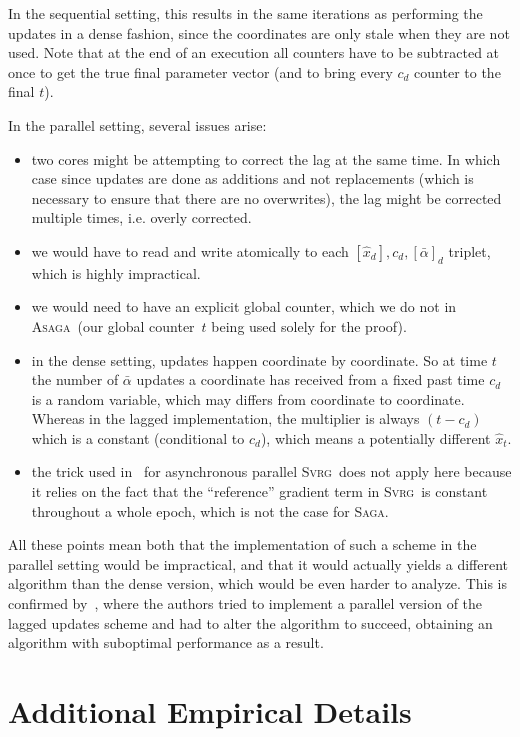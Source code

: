 \documentclass[twoside, 11pt]{article}
\newcommand{\ASAGA}{\textsc{Asaga}}
\newcommand{\SAGA}{\textsc{Saga}}
\newcommand{\SVRG}{\textsc{Svrg}}
\begin{document}
In the sequential setting, this results in the same iterations as performing the updates in a dense fashion, since the coordinates are only stale when they are not used.
Note that at the end of an execution all counters have to be subtracted at once to get the true final parameter vector (and to bring every $c_d$ counter to the final $t$).

In the parallel setting, several issues arise:
\begin{itemize}
\item two cores might be attempting to correct the lag at the same time.
In which case since updates are done as additions and not replacements (which is necessary to ensure that there are no overwrites), the lag might be corrected multiple times, i.e. overly corrected.
\item we would have to read and write atomically to each $[\hat x_d], c_d, [\bar \alpha]_d$ triplet, which is highly impractical.
\item we would need to have an explicit global counter, which we do not in \ASAGA\ (our global counter~$t$ being used solely for the proof).
\item in the dense setting, updates happen coordinate by coordinate.
So at time $t$ the number of $\bar \alpha$ updates a coordinate has received from a fixed past time $c_d$ is a random variable, which may differs from coordinate to coordinate.
Whereas in the lagged implementation, the multiplier is always $(t-c_d)$ which is a constant (conditional to $c_d$), which means a potentially different $\hat x_t$.
\item the trick used in~\citet{smola} for asynchronous parallel \SVRG\ does not apply here because it relies on the fact that the ``reference'' gradient term in \SVRG\ is constant throughout a whole epoch, which is not the case for \SAGA.
\end{itemize}

All these points mean both that the implementation of such a scheme in the parallel setting would be impractical, and that it would actually yields a different algorithm than the dense version, which would be even harder to analyze.
This is confirmed by~\citet{cyclades}, where the authors tried to implement a parallel version of the lagged updates scheme and had to alter the algorithm to succeed, obtaining an algorithm with suboptimal performance as a result.


\section{Additional Empirical Details} \label{apxE}
\end{document}
